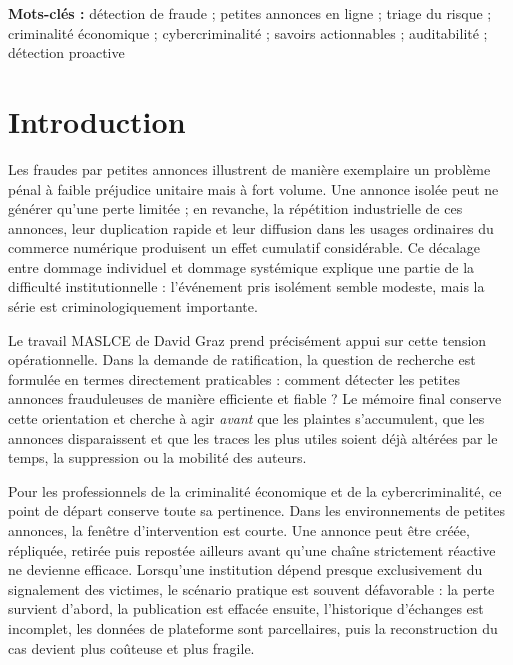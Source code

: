 \documentclass[10pt,a4paper]{article}
\begin{document}
\noindent\textbf{Mots-clés :} détection de fraude ; petites annonces en ligne ; triage du risque ; criminalité économique ; cybercriminalité ; savoirs actionnables ; auditabilité ; détection proactive

\vspace{0.8em}

\newpage

\tableofcontents

\newpage


\section{Introduction}
Les fraudes par petites annonces illustrent de manière exemplaire un problème pénal à faible préjudice unitaire mais à fort volume. Une annonce isolée peut ne générer qu'une perte limitée ; en revanche, la répétition industrielle de ces annonces, leur duplication rapide et leur diffusion dans les usages ordinaires du commerce numérique produisent un effet cumulatif considérable. Ce décalage entre dommage individuel et dommage systémique explique une partie de la difficulté institutionnelle : l'événement pris isolément semble modeste, mais la série est criminologiquement importante.

Le travail MASLCE de David Graz prend précisément appui sur cette tension opérationnelle. Dans la demande de ratification, la question de recherche est formulée en termes directement praticables : comment détecter les petites annonces frauduleuses de manière efficiente et fiable ? Le mémoire final conserve cette orientation et cherche à agir \emph{avant} que les plaintes s'accumulent, que les annonces disparaissent et que les traces les plus utiles soient déjà altérées par le temps, la suppression ou la mobilité des auteurs.

Pour les professionnels de la criminalité économique et de la cybercriminalité, ce point de départ conserve toute sa pertinence. Dans les environnements de petites annonces, la fenêtre d'intervention est courte. Une annonce peut être créée, répliquée, retirée puis repostée ailleurs avant qu'une chaîne strictement réactive ne devienne efficace. Lorsqu'une institution dépend presque exclusivement du signalement des victimes, le scénario pratique est souvent défavorable : la perte survient d'abord, la publication est effacée ensuite, l'historique d'échanges est incomplet, les données de plateforme sont parcellaires, puis la reconstruction du cas devient plus coûteuse et plus fragile.
\end{document}
